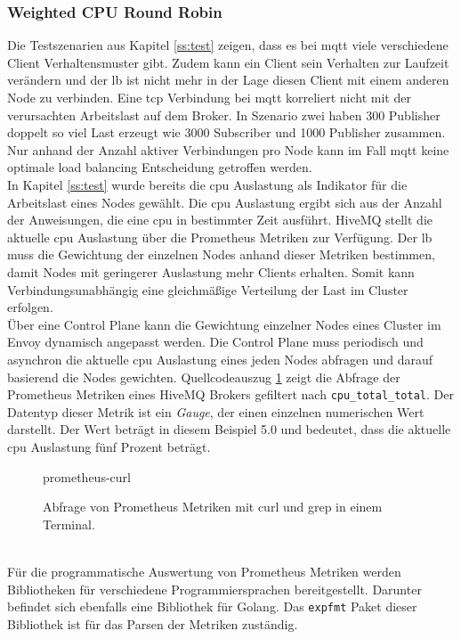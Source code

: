 \subsubsection{Weighted CPU Round Robin} \label{ss:weighted-cpu}
Die Testszenarien aus Kapitel \ref{ss:test} zeigen, dass es bei \ac{mqtt} viele verschiedene Client Verhaltensmuster gibt. Zudem kann ein Client sein Verhalten zur Laufzeit verändern und der \acl{lb} ist nicht mehr in der Lage diesen Client mit einem anderen Node zu verbinden.
Eine \ac{tcp} Verbindung bei \ac{mqtt} korreliert nicht mit der verursachten Arbeitslast auf dem Broker. In Szenario zwei haben 300 Publisher doppelt so viel Last erzeugt wie 3000 Subscriber und 1000 Publisher zusammen.
Nur anhand der Anzahl aktiver Verbindungen pro Node kann im Fall \ac{mqtt} keine optimale load balancing Entscheidung getroffen werden.
\\
In Kapitel \ref{ss:test} wurde bereits die \ac{cpu} Auslastung als Indikator für die Arbeitslast eines Nodes gewählt. Die \ac{cpu} Auslastung ergibt sich aus der Anzahl der Anweisungen, die eine \ac{cpu} in bestimmter Zeit ausführt.
HiveMQ stellt die aktuelle \ac{cpu} Auslastung über die Prometheus Metriken zur Verfügung. Der \acl{lb} muss die Gewichtung der einzelnen Nodes anhand dieser Metriken bestimmen, damit Nodes mit geringerer Auslastung mehr Clients erhalten. Somit kann Verbindungsunabhängig eine gleichmä{\ss}ige Verteilung der Last im Cluster erfolgen.
\\
Über eine Control Plane kann die Gewichtung einzelner Nodes eines Cluster im Envoy dynamisch angepasst werden.
Die Control Plane muss periodisch und asynchron die aktuelle \ac{cpu} Auslastung eines jeden Nodes abfragen und darauf basierend die Nodes gewichten.
Quellcodeauszug \ref{code:prometheus-curl} zeigt die Abfrage der Prometheus Metriken eines HiveMQ Brokers gefiltert nach \verb|cpu_total_total|. Der Datentyp dieser Metrik ist ein \textit{Gauge}, der einen einzelnen numerischen Wert darstellt.\cite{prometheusMetricTypesPrometheus} Der Wert beträgt in diesem Beispiel 5.0 und bedeutet, dass die aktuelle \ac{cpu} Auslastung fünf Prozent beträgt.
\begin{figure}
    {prometheus-curl}
    \caption{Abfrage von Prometheus Metriken mit curl und grep in einem Terminal.}
    \label{code:prometheus-curl}
\end{figure}
\\
Für die programmatische Auswertung von Prometheus Metriken werden Bibliotheken für verschiedene Programmiersprachen bereitgestellt. Darunter befindet sich ebenfalls eine Bibliothek für Golang. Das \verb|expfmt| Paket dieser Bibliothek ist für das Parsen der Metriken zuständig.\cite{ExpfmtPkgGo}
